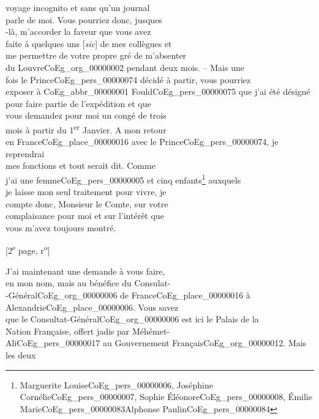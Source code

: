 \documentclass{book}
\begin{document}
voyage incognito et sans qu’un journal\\
parle de moi. Vous pourriez donc, jusques\\
-là, m’accorder la faveur que vous avez\\
faite à quelques uns {[\textit{sic}]} de mes collègues et\\
me permettre de votre propre gré de m’absenter\\
du Louvre\gls{CoEg_org_00000002} pendant deux mois. – Mais une\\
fois le Prince\gls{CoEg_pers_00000074} décidé à partir, vous pourriez\\
exposer à \gls{CoEg_abbr_00000001} Fould\gls{CoEg_pers_00000075} que j’ai été désigné\\
pour faire partie de l’expédition et que\\
vous demandez pour moi un congé de trois\\
mois à partir du 1\textsuperscript{er} Janvier. A mon retour\\
en France\gls{CoEg_place_00000016} avec le Prince\gls{CoEg_pers_00000074}, je reprendrai\\
mes fonctions et tout serait dit. Comme\\
j’ai une femme\gls{CoEg_pers_00000005} et cinq enfants\footnote{Marguerite Louise\gls{CoEg_pers_00000006}, Joséphine Cornélie\gls{CoEg_pers_00000007}, Sophie Éléonore\gls{CoEg_pers_00000008}, Émilie Marie\gls{CoEg_pers_00000083}Alphonse Paulin\gls{CoEg_pers_00000084}} auxquels\\
je laisse mon seul traitement pour vivre, je\\
compte donc, Monsieur le Comte, sur votre\\
complaisance pour moi et sur l’intérêt que\\
vous m’avez toujours montré.
{\footnotesize\begin{center} {[2\textsuperscript{e} page, r\textsuperscript{o}]}\end{center}}
\indent J’ai maintenant une demande à vous faire,\\
en mon nom, mais au bénéfice du Consulat-\\
-Général\gls{CoEg_org_00000006} de France\gls{CoEg_place_00000016} à Alexandrie\gls{CoEg_place_00000006}. Vous savez\\
que le Consultat-Général\gls{CoEg_org_00000006} est ici le Palais de la\\
Nation Française, offert jadis par Méhémet-\\
Ali\gls{CoEg_pers_00000017} au Gouvernement Français\gls{CoEg_org_00000012}. Mais les deux\\
\end{document}
